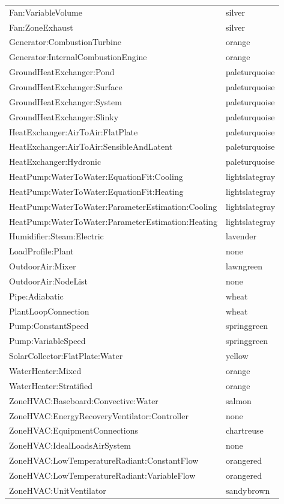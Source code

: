 \begin{longtable}[c]{@{}ll@{}}
Fan:VariableVolume & silver \tabularnewline
Fan:ZoneExhaust & silver \tabularnewline
Generator:CombustionTurbine & orange \tabularnewline
Generator:InternalCombustionEngine & orange \tabularnewline
GroundHeatExchanger:Pond & paleturquoise \tabularnewline
GroundHeatExchanger:Surface & paleturquoise \tabularnewline
GroundHeatExchanger:System & paleturquoise \tabularnewline
GroundHeatExchanger:Slinky & paleturquoise \tabularnewline
HeatExchanger:AirToAir:FlatPlate & paleturquoise \tabularnewline
HeatExchanger:AirToAir:SensibleAndLatent & paleturquoise \tabularnewline
HeatExchanger:Hydronic & paleturquoise \tabularnewline
HeatPump:WaterToWater:EquationFit:Cooling & lightslategray \tabularnewline
HeatPump:WaterToWater:EquationFit:Heating & lightslategray \tabularnewline
HeatPump:WaterToWater:ParameterEstimation:Cooling & lightslategray \tabularnewline
HeatPump:WaterToWater:ParameterEstimation:Heating & lightslategray \tabularnewline
Humidifier:Steam:Electric & lavender \tabularnewline
LoadProfile:Plant & none \tabularnewline
OutdoorAir:Mixer & lawngreen \tabularnewline
OutdoorAir:NodeList & none \tabularnewline
Pipe:Adiabatic & wheat \tabularnewline
PlantLoopConnection & wheat \tabularnewline
Pump:ConstantSpeed & springgreen \tabularnewline
Pump:VariableSpeed & springgreen \tabularnewline
SolarCollector:FlatPlate:Water & yellow \tabularnewline
WaterHeater:Mixed & orange \tabularnewline
WaterHeater:Stratified & orange \tabularnewline
ZoneHVAC:Baseboard:Convective:Water & salmon \tabularnewline
ZoneHVAC:EnergyRecoveryVentilator:Controller & none \tabularnewline
ZoneHVAC:EquipmentConnections & chartreuse \tabularnewline
ZoneHVAC:IdealLoadsAirSystem & none \tabularnewline
ZoneHVAC:LowTemperatureRadiant:ConstantFlow & orangered \tabularnewline
ZoneHVAC:LowTemperatureRadiant:VariableFlow & orangered \tabularnewline
ZoneHVAC:UnitVentilator & sandybrown \tabularnewline
\bottomrule
\end{longtable}

